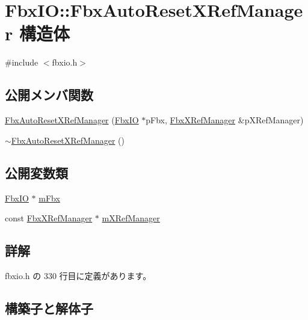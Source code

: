 \hypertarget{struct_fbx_i_o_1_1_fbx_auto_reset_x_ref_manager}{}\section{Fbx\+IO\+:\+:Fbx\+Auto\+Reset\+X\+Ref\+Manager 構造体}
\label{struct_fbx_i_o_1_1_fbx_auto_reset_x_ref_manager}


{\ttfamily \#include $<$fbxio.\+h$>$}

\subsection*{公開メンバ関数}
\begin{DoxyCompactItemize}
\item 
\hyperlink{struct_fbx_i_o_1_1_fbx_auto_reset_x_ref_manager_a4fd55e4840d236b0afb561001dc2faef}{Fbx\+Auto\+Reset\+X\+Ref\+Manager} (\hyperlink{class_fbx_i_o}{Fbx\+IO} $\ast$p\+Fbx, \hyperlink{class_fbx_x_ref_manager}{Fbx\+X\+Ref\+Manager} \&p\+X\+Ref\+Manager)
\item 
\hyperlink{struct_fbx_i_o_1_1_fbx_auto_reset_x_ref_manager_a7a90d25e3fbad8c2e30bc7a3bd21d702}{$\sim$\+Fbx\+Auto\+Reset\+X\+Ref\+Manager} ()
\end{DoxyCompactItemize}
\subsection*{公開変数類}
\begin{DoxyCompactItemize}
\item 
\hyperlink{class_fbx_i_o}{Fbx\+IO} $\ast$ \hyperlink{struct_fbx_i_o_1_1_fbx_auto_reset_x_ref_manager_a5203c9a88c60e8c6f8a092ec2c84759c}{m\+Fbx}
\item 
const \hyperlink{class_fbx_x_ref_manager}{Fbx\+X\+Ref\+Manager} $\ast$ \hyperlink{struct_fbx_i_o_1_1_fbx_auto_reset_x_ref_manager_a65b41fef18ebe8d10db3dafe69cca132}{m\+X\+Ref\+Manager}
\end{DoxyCompactItemize}


\subsection{詳解}


 fbxio.\+h の 330 行目に定義があります。



\subsection{構築子と解体子}
\mbox{\label{struct_fbx_i_o_1_1_fbx_auto_reset_x_ref_manager_a4fd55e4840d236b0afb561001dc2faef}} 
